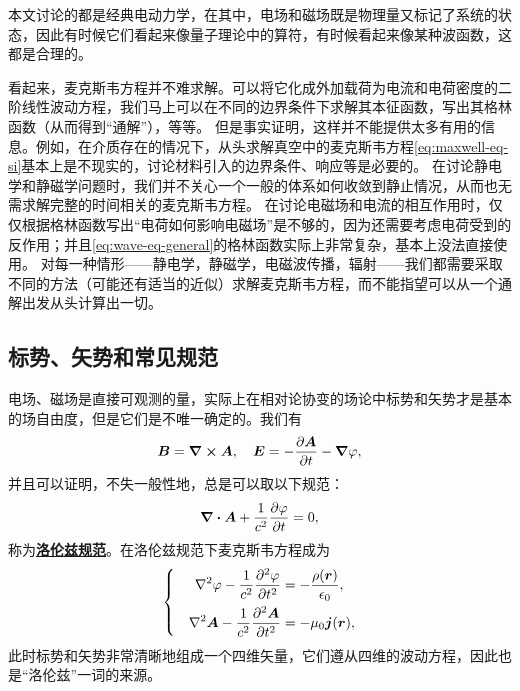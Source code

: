 \documentclass[UTF8, a4paper]{ctexart}
\newcommand*{\concept}[1]{\underline{\textbf{#1}}}
\newenvironment{bigcase}{\left\{\quad\begin{aligned}}{\end{aligned}\right.}
\begin{document}
本文讨论的都是经典电动力学，在其中，电场和磁场既是物理量又标记了系统的状态，因此有时候它们看起来像量子理论中的算符，有时候看起来像某种波函数，这都是合理的。

看起来，麦克斯韦方程并不难求解。可以将它化成外加载荷为电流和电荷密度的二阶线性波动方程，我们马上可以在不同的边界条件下求解其本征函数，写出其格林函数（从而得到“通解”），等等。
但是事实证明，这样并不能提供太多有用的信息。例如，在介质存在的情况下，从头求解真空中的麦克斯韦方程\eqref{eq:maxwell-eq-si}基本上是不现实的，讨论材料引入的边界条件、响应等是必要的。
在讨论静电学和静磁学问题时，我们并不关心一个一般的体系如何收敛到静止情况，从而也无需求解完整的时间相关的麦克斯韦方程。
在讨论电磁场和电流的相互作用时，仅仅根据格林函数写出“电荷如何影响电磁场”是不够的，因为还需要考虑电荷受到的反作用；并且\eqref{eq:wave-eq-general}的格林函数实际上非常复杂，基本上没法直接使用。
对每一种情形——静电学，静磁学，电磁波传播，辐射——我们都需要采取不同的方法（可能还有适当的近似）求解麦克斯韦方程，而不能指望可以从一个通解出发从头计算出一切。

\subsection{标势、矢势和常见规范}

电场、磁场是直接可观测的量，实际上在相对论协变的场论中标势和矢势才是基本的场自由度，但是它们是不唯一确定的。我们有
\begin{equation}
    \vb*{B} = \curl{\vb*{A}}, \quad \vb*{E} = - \pdv{\vb*{A}}{t} - \grad{\varphi},
\end{equation}
并且可以证明，不失一般性地，总是可以取以下规范：
\begin{equation}
    \div{\vb*{A}} + \frac{1}{c^2} \pdv{\varphi}{t} = 0,
\end{equation}
称为\concept{洛伦兹规范}。在洛伦兹规范下麦克斯韦方程成为
\begin{equation}
    \begin{bigcase}
        \laplacian{\varphi} - \frac{1}{c^2} \pdv[2]{\varphi}{t} &= - \frac{\rho(\vb*{r})}{\epsilon_0}, \\
        \laplacian{\vb*{A}} - \frac{1}{c^2} \pdv[2]{\vb*{A}}{t} &= - \mu_0 \vb*{j}(\vb*{r}),
    \end{bigcase}
\end{equation}
此时标势和矢势非常清晰地组成一个四维矢量，它们遵从四维的波动方程，因此也是“洛伦兹”一词的来源。
\end{document}
